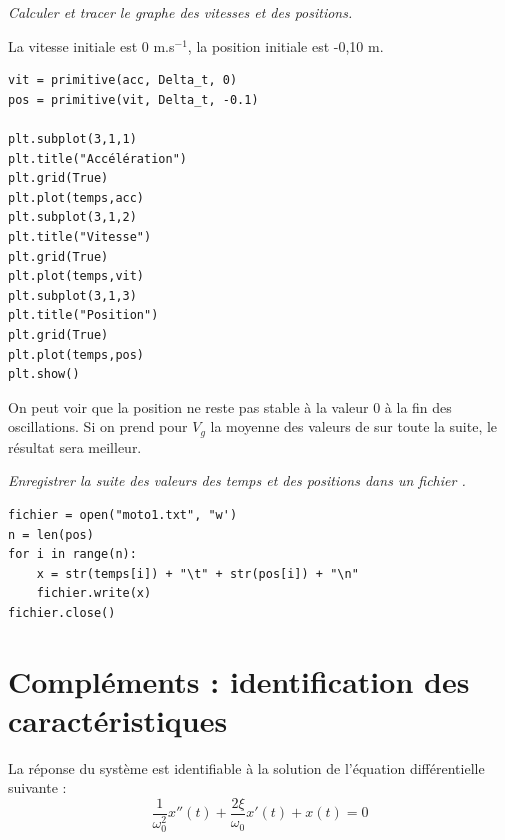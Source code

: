 \begin{Exercise}\it Calculer et tracer le graphe des vitesses et des positions.

La vitesse initiale est 0 m.s$^{-1}$, la position initiale est -0,10 m.
\end{Exercise}
\begin{Answer}
\begin{lstlisting}
vit = primitive(acc, Delta_t, 0)
pos = primitive(vit, Delta_t, -0.1)

plt.subplot(3,1,1)          
plt.title("Accélération") 
plt.grid(True)
plt.plot(temps,acc) 
plt.subplot(3,1,2)          
plt.title("Vitesse") 
plt.grid(True)
plt.plot(temps,vit)
plt.subplot(3,1,3)          
plt.title("Position") 
plt.grid(True)
plt.plot(temps,pos)
plt.show()
\end{lstlisting}
\end{Answer}
On peut voir que la position ne reste pas stable à la valeur 0 à la fin des oscillations. Si on prend pour $V_g$ la moyenne des valeurs de  sur toute la suite, le résultat sera meilleur.
\begin{Exercise}\it 
Enregistrer la suite des valeurs des temps et des positions dans un fichier .
\end{Exercise}
\begin{Answer}
\begin{lstlisting}
fichier = open("moto1.txt", "w')
n = len(pos)
for i in range(n):
    x = str(temps[i]) + "\t" + str(pos[i]) + "\n"
    fichier.write(x)
fichier.close()
\end{lstlisting}
\end{Answer}
\section{Compléments : identification des caractéristiques}%
La réponse du système est identifiable à la solution de l'équation différentielle suivante :
\[\frac{1}{\omega_0^2}x''(t) + \dfrac{2\xi}{\omega_0}x'(t) + x(t) = 0\]
 

